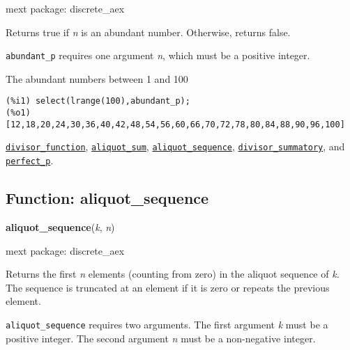 \documentclass[]{article}
\begin{document}
\noindent mext package: discrete\_aex



\vspace{5 pt}
Returns true if {\it n} is an abundant number. Otherwise, returns false. 

\vspace{5 pt}

   {\tt abundant\_p} requires one argument {\it n}, which must be a positive integer.


\vspace{5 pt}


   The abundant numbers between 1 and 100 

\begin{Verbatim}[frame=single]
(%i1) select(lrange(100),abundant_p);
(%o1) [12,18,20,24,30,36,40,42,48,54,56,60,66,70,72,78,80,84,88,90,96,100]
\end{Verbatim}


  \hyperlink{divisor_function}{{\tt divisor\_function}}, \hyperlink{aliquot_sum}{{\tt aliquot\_sum}}, \hyperlink{aliquot_sequence}{{\tt aliquot\_sequence}}, \hyperlink{divisor_summatory}{{\tt divisor\_summatory}}, and \hyperlink{perfect_p}{{\tt perfect\_p}}.

\vspace{5 pt}


\subsection{Function: aliquot\_sequence\label{sec:aliquot_sequence}}
\hypertarget{aliquot_sequence}{}
{\bf aliquot\_sequence}({\it k}, {\it n})


\noindent mext package: discrete\_aex



\vspace{5 pt}
Returns the first {\it n} elements (counting from zero) in the aliquot sequence of {\it k}. The sequence is truncated at an element if it is zero or repeats the previous element. 

\vspace{5 pt}

   {\tt aliquot\_sequence} requires two arguments.
    The first argument {\it k} must be a positive integer.
    The second argument {\it n} must be a non-negative integer.
\end{document}

